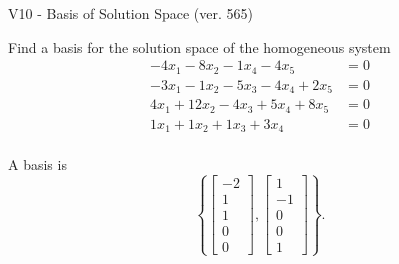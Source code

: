 \begin{exercise}
  \begin{exerciseTitle}V10 - Basis of Solution Space (ver. 565)\end{exerciseTitle}
  \begin{exerciseStatement}
    Find a basis for the solution space of the homogeneous system 
\begin{align*}
 -4 x_ 1 -8 x_ 2 -1 x_ 4 -4 x_ 5 &= 0  \\ 
  -3 x_ 1 -1 x_ 2 -5 x_ 3 -4 x_ 4 + 2 x_ 5 &= 0  \\ 
  4 x_ 1 + 12 x_ 2 -4 x_ 3 + 5 x_ 4 + 8 x_ 5 &= 0  \\ 
  1 x_ 1 + 1 x_ 2 + 1 x_ 3 + 3 x_ 4 &= 0  \\ 
 \end{align*}


 
  \end{exerciseStatement}

  \begin{exerciseAnswer}
   A basis is   
\[\left\{\left[\begin{array}{c}
-2 \\
1 \\
1 \\
0 \\
0
\end{array}\right] , \left[\begin{array}{c}
1 \\
-1 \\
0 \\
0 \\
1
\end{array}\right]\right\}.\]

  


  \end{exerciseAnswer}
\end{exercise}